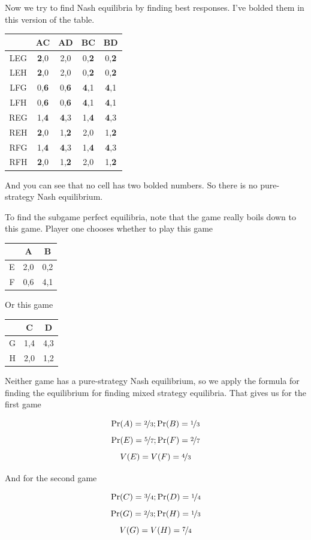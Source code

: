 \documentclass[11pt,]{article}
\begin{document}
Now we try to find Nash equilibria by finding best responses. I've
bolded them in this version of the table.

\begin{longtable}[]{@{}ccccc@{}}
\toprule
& AC & AD & BC & BD\tabularnewline
\midrule
\endhead
LEG & \textbf{2},0 & 2,0 & 0,\textbf{2} & 0,\textbf{2}\tabularnewline
LEH & \textbf{2},0 & 2,0 & 0,\textbf{2} & 0,\textbf{2}\tabularnewline
LFG & 0,\textbf{6} & 0,\textbf{6} & \textbf{4},1 &
\textbf{4},1\tabularnewline
LFH & 0,\textbf{6} & 0,\textbf{6} & \textbf{4},1 &
\textbf{4},1\tabularnewline
REG & 1,\textbf{4} & \textbf{4},3 & 1,\textbf{4} &
\textbf{4},3\tabularnewline
REH & \textbf{2},0 & 1,\textbf{2} & 2,0 & 1,\textbf{2}\tabularnewline
RFG & 1,\textbf{4} & \textbf{4},3 & 1,\textbf{4} &
\textbf{4},3\tabularnewline
RFH & \textbf{2},0 & 1,\textbf{2} & 2,0 & 1,\textbf{2}\tabularnewline
\bottomrule
\end{longtable}

And you can see that no cell has two bolded numbers. So there is no
pure-strategy Nash equilibrium.

To find the subgame perfect equilibria, note that the game really boils
down to this game. Player one chooses whether to play this game

\begin{longtable}[]{@{}rcc@{}}
\toprule
& A & B\tabularnewline
\midrule
\endhead
E & 2,0 & 0,2\tabularnewline
F & 0,6 & 4,1\tabularnewline
\bottomrule
\end{longtable}

Or this game

\begin{longtable}[]{@{}rcc@{}}
\toprule
& C & D\tabularnewline
\midrule
\endhead
G & 1,4 & 4,3\tabularnewline
H & 2,0 & 1,2\tabularnewline
\bottomrule
\end{longtable}

Neither game has a pure-strategy Nash equilibrium, so we apply the
formula for finding the equilibrium for finding mixed strategy
equilibria. That gives us for the first game

\[
\Pr(A) = \nicefrac{2}{3}; \Pr(B) = \nicefrac{1}{3}
\] \[
\Pr(E) = \nicefrac{5}{7}; \Pr(F) = \nicefrac{2}{7}
\] \[
V(E) = V(F) = \nicefrac{4}{3}
\]

And for the second game

\[
\Pr(C) = \nicefrac{3}{4}; \Pr(D) = \nicefrac{1}{4}
\] \[
\Pr(G) = \nicefrac{2}{3}; \Pr(H) = \nicefrac{1}{3}
\] \[
V(G) = V(H) = \nicefrac{7}{4}
\]
\end{document}
